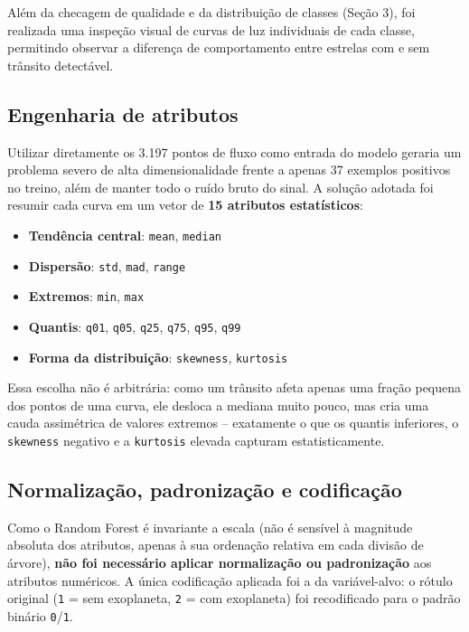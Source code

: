 \documentclass[12pt,a4paper]{article}
\begin{document}
Além da checagem de qualidade e da distribuição de classes (Seção 3), foi realizada uma inspeção visual de curvas de luz individuais de cada classe, permitindo observar a diferença de comportamento entre estrelas com e sem trânsito detectável.

\subsection{Engenharia de atributos}

Utilizar diretamente os 3.197 pontos de fluxo como entrada do modelo geraria um problema severo de alta dimensionalidade frente a apenas 37 exemplos positivos no treino, além de manter todo o ruído bruto do sinal. A solução adotada foi resumir cada curva em um vetor de \textbf{15 atributos estatísticos}:

\begin{itemize}[leftmargin=1.5cm]
    \item \textbf{Tendência central}: \texttt{mean}, \texttt{median}
    \item \textbf{Dispersão}: \texttt{std}, \texttt{mad}, \texttt{range}
    \item \textbf{Extremos}: \texttt{min}, \texttt{max}
    \item \textbf{Quantis}: \texttt{q01}, \texttt{q05}, \texttt{q25}, \texttt{q75}, \texttt{q95}, \texttt{q99}
    \item \textbf{Forma da distribuição}: \texttt{skewness}, \texttt{kurtosis}
\end{itemize}

Essa escolha não é arbitrária: como um trânsito afeta apenas uma fração pequena dos pontos de uma curva, ele desloca a mediana muito pouco, mas cria uma cauda assimétrica de valores extremos -- exatamente o que os quantis inferiores, o \texttt{skewness} negativo e a \texttt{kurtosis} elevada capturam estatisticamente.

\subsection{Normalização, padronização e codificação}

Como o Random Forest é invariante a escala (não é sensível à magnitude absoluta dos atributos, apenas à sua ordenação relativa em cada divisão de árvore), \textbf{não foi necessário aplicar normalização ou padronização} aos atributos numéricos. A única codificação aplicada foi a da variável-alvo: o rótulo original (\texttt{1} = sem exoplaneta, \texttt{2} = com exoplaneta) foi recodificado para o padrão binário \texttt{0}/\texttt{1}.
\end{document}
